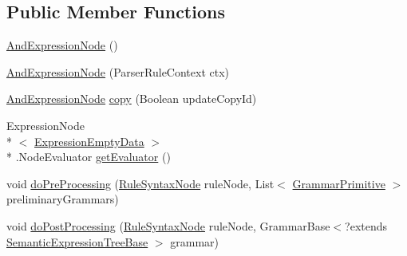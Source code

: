 \subsection*{Public Member Functions}
\begin{DoxyCompactItemize}
\item 
\hyperlink{classit_1_1emarolab_1_1cagg_1_1core_1_1language_1_1syntax_1_1expressionTree_1_1expressionNodeType_1_1AndExpressionNode_a85b5d2e7fc38fd438dbf7615d5f6ec78}{And\-Expression\-Node} ()
\item 
\hyperlink{classit_1_1emarolab_1_1cagg_1_1core_1_1language_1_1syntax_1_1expressionTree_1_1expressionNodeType_1_1AndExpressionNode_a775ec880b5552fd6d3a2ace20840e72a}{And\-Expression\-Node} (Parser\-Rule\-Context ctx)
\item 
\hyperlink{classit_1_1emarolab_1_1cagg_1_1core_1_1language_1_1syntax_1_1expressionTree_1_1expressionNodeType_1_1AndExpressionNode}{And\-Expression\-Node} \hyperlink{classit_1_1emarolab_1_1cagg_1_1core_1_1language_1_1syntax_1_1expressionTree_1_1expressionNodeType_1_1AndExpressionNode_a0060069aa2e5eec78ac62ed4215f96d6}{copy} (Boolean update\-Copy\-Id)
\item 
Expression\-Node\\*
$<$ \hyperlink{classit_1_1emarolab_1_1cagg_1_1core_1_1language_1_1syntax_1_1expressionTree_1_1ExpressionDataFactory_1_1ExpressionEmptyData}{Expression\-Empty\-Data} $>$\\*
.Node\-Evaluator \hyperlink{classit_1_1emarolab_1_1cagg_1_1core_1_1language_1_1syntax_1_1expressionTree_1_1expressionNodeType_1_1AndExpressionNode_aefb2f0f8f552337bddcc12849b645d98}{get\-Evaluator} ()
\item 
void \hyperlink{classit_1_1emarolab_1_1cagg_1_1core_1_1language_1_1syntax_1_1expressionTree_1_1expressionNodeType_1_1AndExpressionNode_a050de612fef501172bab78d4e94fa78a}{do\-Pre\-Processing} (\hyperlink{classit_1_1emarolab_1_1cagg_1_1core_1_1language_1_1syntax_1_1abstractTree_1_1syntaxNodeType_1_1RuleSyntaxNode}{Rule\-Syntax\-Node} rule\-Node, List$<$ \hyperlink{classit_1_1emarolab_1_1cagg_1_1core_1_1language_1_1syntax_1_1GrammarPrimitive}{Grammar\-Primitive} $>$ preliminary\-Grammars)
\item 
void \hyperlink{classit_1_1emarolab_1_1cagg_1_1core_1_1language_1_1syntax_1_1expressionTree_1_1expressionNodeType_1_1AndExpressionNode_a5aa4a528acac06b783f85e84c62e7d5c}{do\-Post\-Processing} (\hyperlink{classit_1_1emarolab_1_1cagg_1_1core_1_1language_1_1syntax_1_1abstractTree_1_1syntaxNodeType_1_1RuleSyntaxNode}{Rule\-Syntax\-Node} rule\-Node, Grammar\-Base$<$?extends \hyperlink{interfaceit_1_1emarolab_1_1cagg_1_1core_1_1evaluation_1_1semanticGrammar_1_1syntaxCompiler_1_1SemanticExpressionTreeBase}{Semantic\-Expression\-Tree\-Base} $>$ grammar)
\end{DoxyCompactItemize}

